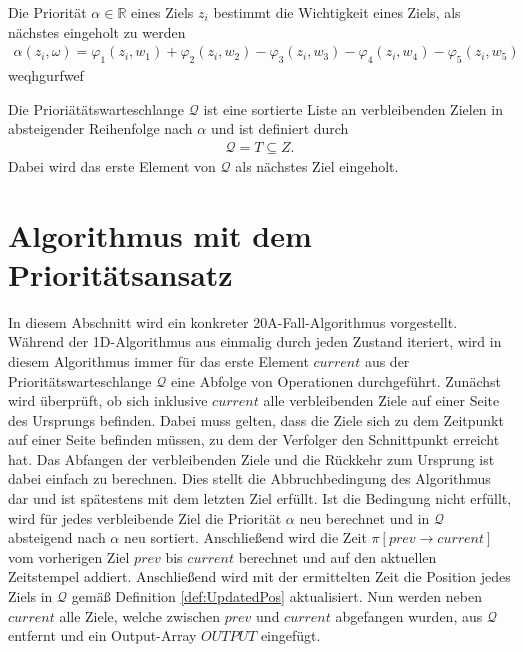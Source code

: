 \documentclass[german,version-2019-11]{uzl-thesis}
\begin{document}
\begin{definition}
Die Priorität $\alpha\in\mathbb{R}$ eines Ziels $z_i$ bestimmt die Wichtigkeit eines Ziels, als nächstes eingeholt zu werden
\begin{align*}
\alpha(z_i, \omega) = \varphi_1(z_i,w_1) + \varphi_2(z_i,w_2) - \varphi_3(z_i,w_3) - \varphi_4(z_i,w_4) - \varphi_5(z_i,w_5)
\end{align*}
weqhgurfwef
\end{definition}

\begin{definition}
Die Prioriätätswarteschlange $\mathcal{Q}$ ist eine sortierte Liste an verbleibenden Zielen in absteigender Reihenfolge nach $\alpha$ und ist definiert durch
\begin{align*}
\mathcal{Q} = T\subseteq Z.
\end{align*}
Dabei wird das erste Element von $\mathcal{Q}$ als nächstes Ziel eingeholt.
\end{definition}


\section{Algorithmus mit dem Prioritätsansatz}

In diesem Abschnitt wird ein konkreter 20A-Fall-Algorithmus vorgestellt. Während der 1D-Algorithmus aus \cite{helvig} einmalig durch jeden Zustand iteriert, wird in diesem Algorithmus immer für das erste Element $current$ aus der Prioritätswarteschlange $\mathcal{Q}$ eine Abfolge von Operationen durchgeführt. Zunächst wird überprüft, ob sich inklusive $current$ alle verbleibenden Ziele auf einer Seite des Ursprungs befinden. Dabei muss gelten, dass die Ziele sich zu dem Zeitpunkt auf einer Seite befinden müssen, zu dem der Verfolger den Schnittpunkt erreicht hat. Das Abfangen der verbleibenden Ziele und die Rückkehr zum Ursprung ist dabei einfach zu berechnen. Dies stellt die Abbruchbedingung des Algorithmus dar und ist spätestens mit dem letzten Ziel erfüllt. Ist die Bedingung nicht erfüllt, wird für jedes verbleibende Ziel die Priorität $\alpha$ neu berechnet und in $\mathcal{Q}$ absteigend nach $\alpha$ neu sortiert. 
Anschließend wird die Zeit $\pi[prev\rightarrow current]$ vom vorherigen Ziel $prev$ bis $current$ berechnet und auf den aktuellen Zeitstempel addiert. Anschließend wird mit der ermittelten Zeit die Position jedes Ziels in $\mathcal{Q}$ gemäß Definition \ref{def:UpdatedPos} aktualisiert. 
Nun werden neben $current$ alle Ziele, welche zwischen $prev$ und $current$ abgefangen wurden, aus $\mathcal{Q}$ entfernt und ein Output-Array $OUTPUT$ eingefügt.
\end{document}
